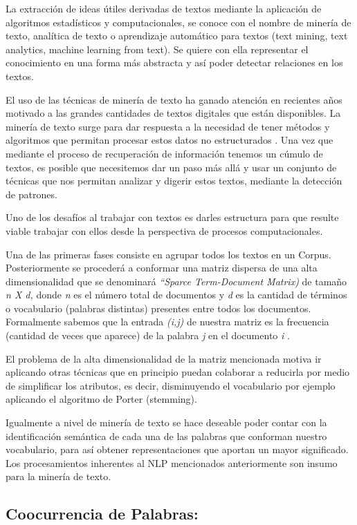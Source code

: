 \documentclass[
  10,
  spanish,
  openany]{book}
\begin{document}
La extracción de ideas útiles derivadas de textos mediante la aplicación de algoritmos estadísticos y computacionales, se conoce con el nombre de minería de texto, analítica de texto o aprendizaje automático para textos (text mining, text analytics, machine learning from text). Se quiere con ella representar el conocimiento en una forma más abstracta y así poder detectar relaciones en los textos.

El uso de las técnicas de minería de texto ha ganado atención en recientes años motivado a las grandes cantidades de textos digitales que están disponibles. La minería de texto surge para dar respuesta a la necesidad de tener métodos y algoritmos que permitan procesar estos datos no estructurados \citep{miningt2012} . Una vez que mediante el proceso de recuperación de información tenemos un cúmulo de textos, es posible que necesitemos dar un paso más allá y usar un conjunto de técnicas que nos permitan analizar y digerir estos textos, mediante la detección de patrones.

Uno de los desafíos al trabajar con textos es darles estructura para que resulte viable trabajar con ellos desde la perspectiva de procesos computacionales.

Una de las primeras fases consiste en agrupar todos los textos en un Corpus. Posteriormente se procederá a conformar una matriz dispersa de una alta dimensionalidad que se denominará \emph{``Sparce Term-Document Matrix)} de tamaño \emph{n X d,} donde \emph{n} es el número total de documentos y \emph{d} es la cantidad de términos o vocabulario (palabras distintas) presentes entre todos los documentos. Formalmente sabemos que la entrada \emph{(i,j)} de nuestra matriz es la frecuencia (cantidad de veces que aparece) de la palabra \emph{j} en el documento \emph{i} .

El problema de la alta dimensionalidad de la matriz mencionada motiva ir aplicando otras técnicas que en principio puedan colaborar a reducirla por medio de simplificar los atributos, es decir, disminuyendo el vocabulario por ejemplo aplicando el algoritmo de Porter (stemming).

Igualmente a nivel de minería de texto se hace deseable poder contar con la identificación semántica de cada una de las palabras que conforman nuestro vocabulario, para así obtener representaciones que aportan un mayor significado. Los procesamientos inherentes al NLP mencionados anteriormente son insumo para la minería de texto.

\hypertarget{coocurrencia}{%
\subsection{Coocurrencia de Palabras:}\label{coocurrencia}}
\end{document}
